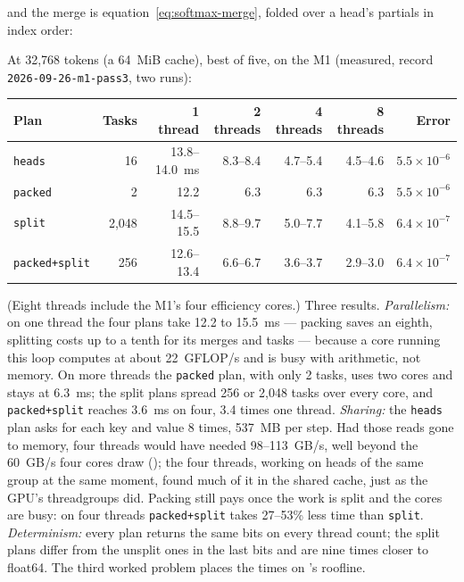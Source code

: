 
\noindent and the merge is equation~\eqref{eq:softmax-merge}, folded over a
head's partials in index order:


\noindent At 32,768 tokens (a 64~MiB cache), best of five, on the M1 (measured,
record \texttt{2026-09-26-m1-pass3}, two runs):

\begin{center}\small
\begin{tabular}{@{}lrrrrrr@{}}
\toprule
Plan & Tasks & 1 thread & 2 threads & 4 threads & 8 threads & Error \\
\midrule
\texttt{heads} & 16 & 13.8--14.0~ms & 8.3--8.4 & 4.7--5.4 & 4.5--4.6 & $5.5\times10^{-6}$ \\
\texttt{packed} & 2 & 12.2 & 6.3 & 6.3 & 6.3 & $5.5\times10^{-6}$ \\
\texttt{split} & 2,048 & 14.5--15.5 & 8.8--9.7 & 5.0--7.7 & 4.1--5.8 & $6.4\times10^{-7}$ \\
\texttt{packed+split} & 256 & 12.6--13.4 & 6.6--6.7 & 3.6--3.7 & 2.9--3.0 & $6.4\times10^{-7}$ \\
\bottomrule
\end{tabular}
\end{center}

\noindent (Eight threads include the M1's four efficiency cores.) Three results.
\emph{Parallelism:} on one thread the four plans take 12.2 to 15.5~ms ---
packing saves an eighth, splitting costs up to a tenth for its merges and
tasks --- because a core running this loop computes at about 22~GFLOP/s and is
busy with arithmetic, not memory. On more threads the \texttt{packed} plan, with
only 2 tasks, uses two cores and stays at 6.3~ms; the split plans spread 256 or
2,048 tasks over every core, and \texttt{packed+split} reaches 3.6~ms on four,
3.4 times one thread. \emph{Sharing:} the \texttt{heads} plan asks for each key
and value 8 times, 537~MB per step. Had those reads gone to memory, four threads
would have needed 98--113~GB/s, well beyond the 60~GB/s four cores draw
(); the four threads, working on heads of the same group at the
same moment, found much of it in the shared cache, just as the GPU's
threadgroups did. Packing still pays once the work is split and the cores are
busy: on four threads \texttt{packed+split} takes 27--53\% less time than
\texttt{split}.
\emph{Determinism:} every plan returns the same bits on every thread count; the
split plans differ from the unsplit ones in the last bits and are nine times
closer to float64. The third worked problem places the times on
's roofline.

